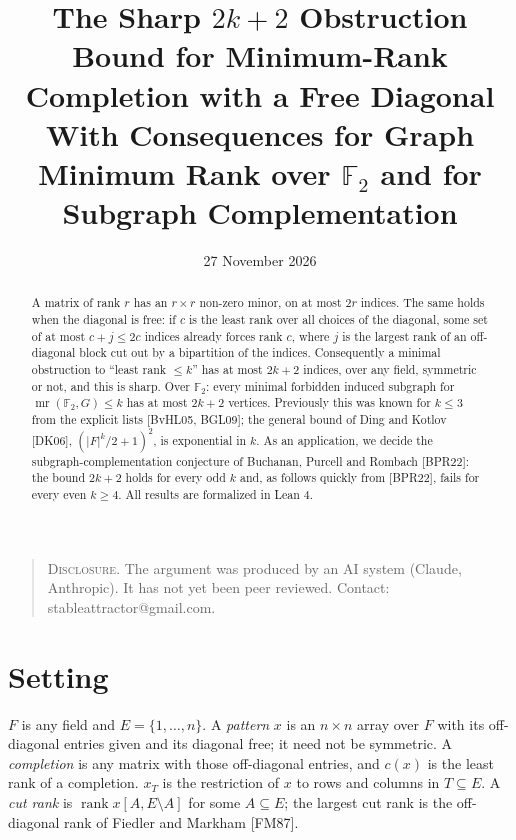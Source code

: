 \documentclass[11pt,letterpaper,reqno]{amsart}
\title[The Sharp $2k+2$ Obstruction Bound for Minimum-Rank Completion with a Free Diagonal]{The Sharp $2k+2$ Obstruction Bound for Minimum-Rank Completion with a Free Diagonal\\[6pt] {\mdseries\small With Consequences for Graph Minimum Rank over $\mathbb{F}_2$ and for Subgraph Complementation}}
\date{27 November 2026}
\theoremstyle{spaced}
\begin{document}
\begin{abstract}
A matrix of rank \(r\) has an \(r \times r\) non-zero minor, on at most \(2r\) indices. The same holds when the diagonal is free: if \(c\) is the least rank over all choices of the diagonal, some set of at most \(c + j \le 2c\) indices already forces rank \(c\), where \(j\) is the largest rank of an off-diagonal block cut out by a bipartition of the indices. Consequently a minimal obstruction to ``least rank \(\le k\)'' has at most \(2k+2\) indices, over any field, symmetric or not, and this is sharp. Over \(\mathbb{F}_2\): every minimal forbidden induced subgraph for \(\operatorname{mr}(\mathbb{F}_2, G) \le k\) has at most \(2k+2\) vertices. Previously this was known for \(k \le 3\) from the explicit lists {[}BvHL05, BGL09{]}; the general bound of Ding and Kotlov {[}DK06{]}, \((\lvert F\rvert^k/2 + 1)^2\), is exponential in \(k\). As an application, we decide the subgraph-complementation conjecture of Buchanan, Purcell and Rombach {[}BPR22{]}: the bound \(2k+2\) holds for every odd \(k\) and, as follows quickly from {[}BPR22{]}, fails for every even \(k \ge 4\). All results are formalized in Lean 4.

\end{abstract}
\maketitle
\begin{quote}\small
\textsc{Disclosure.} The argument was produced by an AI system (Claude, Anthropic). It has not yet been peer reviewed. Contact: stableattractor@gmail.com.

\end{quote}
\smallskip
\hypertarget{setting}{%
\section{Setting}\label{setting}}

\(F\) is any field and \(E = \{1, \dots, n\}\). A \emph{pattern} \(x\) is an \(n \times n\) array over \(F\) with its off-diagonal entries given and its diagonal free; it need not be symmetric. A \emph{completion} is any matrix with those off-diagonal entries, and \(c(x)\) is the least rank of a completion. \(x_T\) is the restriction of \(x\) to rows and columns in \(T \subseteq E\). A \emph{cut rank} is \(\operatorname{rank} x[A, E \setminus A]\) for some \(A \subseteq E\); the largest cut rank is the off-diagonal rank of Fiedler and Markham {[}FM87{]}.
\end{document}
